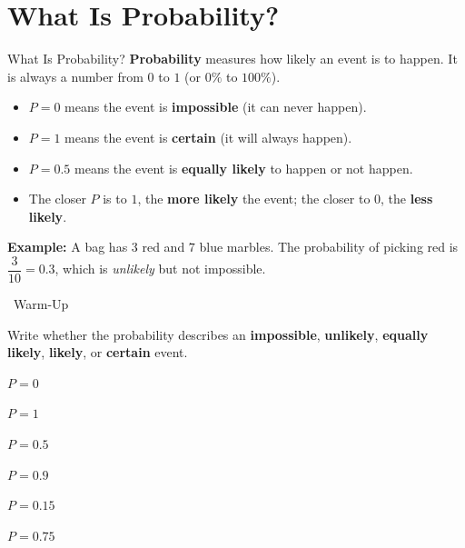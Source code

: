 \section{What Is Probability?}

\begin{quickReview}{What Is Probability?}
\textbf{Probability} measures how likely an event is to happen. It is always a number from $0$ to $1$ (or $0\%$ to $100\%$).

\begin{itemize}[leftmargin=*]
    \item $P = 0$ means the event is \textbf{impossible} (it can never happen).
    \item $P = 1$ means the event is \textbf{certain} (it will always happen).
    \item $P = 0.5$ means the event is \textbf{equally likely} to happen or not happen.
    \item The closer $P$ is to $1$, the \textbf{more likely} the event; the closer to $0$, the \textbf{less likely}.
\end{itemize}

\medskip
\textbf{Example:} A bag has $3$ red and $7$ blue marbles. The probability of picking red is $\dfrac{3}{10} = 0.3$, which is \emph{unlikely} but not impossible.
\end{quickReview}

\begin{practiceBox}[funGreen]{\faSun~Warm-Up}

Write whether the probability describes an \textbf{impossible}, \textbf{unlikely}, \textbf{equally likely}, \textbf{likely}, or \textbf{certain} event.

\prob $P = 0$ \answerBlank[3cm]

\prob $P = 1$ \answerBlank[3cm]

\prob $P = 0.5$ \answerBlank[3cm]

\prob $P = 0.9$ \answerBlank[3cm]

\prob $P = 0.15$ \answerBlank[3cm]

\prob $P = 0.75$ \answerBlank[3cm]

\end{practiceBox}

